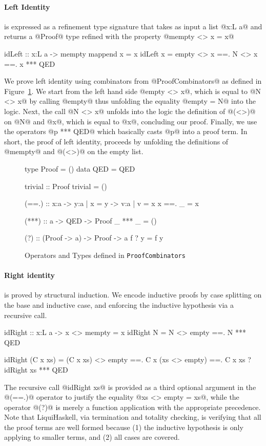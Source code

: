 \paragraph{Left Identity} is expressed
as a refinement type signature that takes as input
a list @x:L a@ and returns a @Proof@ type refined
with the property @mempty <> x = x@
\begin{code}
idLeft :: x:L a -> { mempty mappend x = x }
idLeft x = empty <> x ==. N <> x ==. x *** QED
\end{code}
%
We prove left identity using combinators from @ProofCombinators@ as
defined in Figure~\ref{figure:proofcombinators}.
%
We start from the left hand side @empty <> x@,
which is equal to @N <> x@ by calling @empty@ thus
unfolding the equality @empty = N@ into the logic.
%
Next, the call @N <> x@ unfolds into the logic the definition of @(<>)@
on @N@ and @x@, which is equal to @x@, concluding our proof.
%
Finally, we use the operators @p *** QED@ which basically casts @p@ into a proof term.
%
In short, the proof of left identity, proceeds by unfolding the definitions of @mempty@
and @(<>)@ on the empty list.

\begin{figure}[t]
\begin{code}
type Proof = ()
data QED   = QED

trivial :: Proof
trivial = ()

(==.) :: x:a -> y:{a | x = y} -> {v:a | v = x}
x ==. _ = x

(***) :: a -> QED -> Proof
_ *** _ = ()

(?) :: (Proof -> a) -> Proof -> a
f ? y = f y
\end{code}
\caption{Operators and Types defined in \texttt{ProofCombinators}}
\label{figure:proofcombinators}
\end{figure}

\paragraph{Right identity} is proved by structural induction.
%
We encode inductive proofs by case splitting on the base and inductive case,
and enforcing the inductive hypothesis via a recursive call.
\begin{code}
idRight :: x:L a -> { x <> mempty = x }
idRight N = N <> empty ==. N *** QED

idRight (C x xs)
   =   (C x xs) <> empty
   ==. C x (xs <> empty)
   ==. C x xs ? idRight xs
   *** QED
\end{code}
The recursive call @idRight xs@ is provided
as a third optional argument in the @(==.)@
operator to justify the equality @xs <> empty = xs@,
while the operator @(?)@ is merely a function application
with the appropriate precedence.
%
Note that LiquiHaskell, via termination and totality checking,
is verifying that all the proof terms are well formed because
(1) the inductive hypothesis is only applying to smaller terms, and
(2) all cases are covered.


